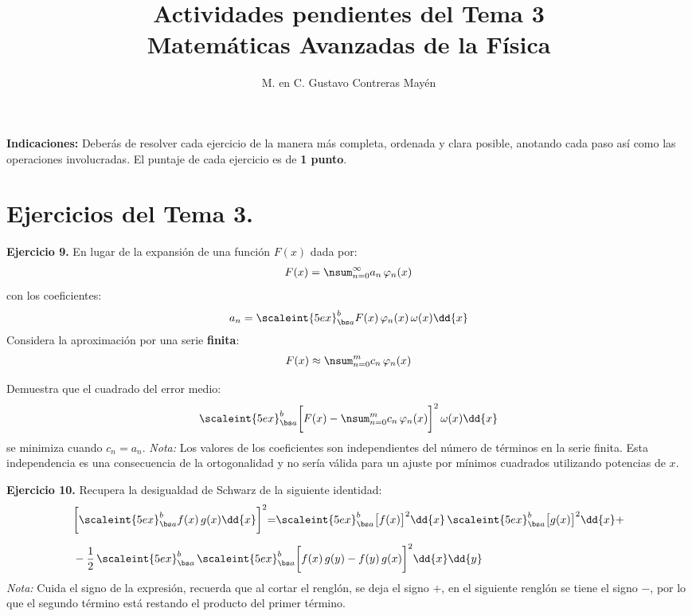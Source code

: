 
\usepackage{apacite}
\title{Actividades pendientes del Tema 3 \\[0.3em]  \large{Matemáticas Avanzadas de la Física}\vspace{-3ex}}
\author{M. en C. Gustavo Contreras Mayén}
\date{ }

\vspace{-4cm}
\maketitle
\fontsize{14}{14}\selectfont

\textbf{Indicaciones: } Deberás de resolver cada ejercicio de la manera más completa, ordenada y clara posible, anotando cada paso así como las operaciones involucradas. El puntaje de cada ejercicio es de \textbf{1 punto}.

\section{Ejercicios del Tema 3.}
\textbf{Ejercicio 9. } En lugar de la expansión de una función $F(x)$ dada por:
\begin{align*}
F(x) = \nsum_{n=0}^{\infty} a_{n} \, \varphi_{n} (x)
\end{align*}
con los coeficientes:
\begin{align*}
a_{n} = \scaleint{5ex}_{\bs a}^{b} F(x) \, \varphi_{n} (x) \, \omega (x) \dd{x}
\end{align*}
Considera la aproximación por una serie \textbf{finita}:
\begin{align*}
F(x) \approx \nsum_{n=0}^{m} c_{n} \, \varphi_{n} (x)
\end{align*}

Demuestra que el cuadrado del error medio:
\begin{align*}
\scaleint{5ex}_{\bs a}^{b} \bigg[ F(x) - \nsum_{n=0}^{m} c_{n} \, \varphi_{n} (x) \bigg]^{2} \, \omega (x) \dd{x}
\end{align*}
se minimiza cuando $c_{n} = a_{n}$. \emph{Nota: } Los valores de los coeficientes son independientes del número de términos en la serie finita. Esta independencia es una consecuencia de la ortogonalidad y no sería válida para un ajuste por mínimos cuadrados utilizando potencias de $x$.
\par
\textbf{Ejercicio 10. } Recupera la desigualdad de Schwarz de la siguiente identidad:
\begin{align*}
&\bigg[ \scaleint{5ex}_{\bs a}^{b} f(x) \, g(x) \dd{x} \bigg
]^{2} {=} \scaleint{5ex}_{\bs a}^{b} \big[ f(x) \big
]^{2} \dd{x} \, \scaleint{5ex}_{\bs a}^{b} \big[ g(x) \big
]^{2} \dd{x} + \\[0.5em]
&- \dfrac{1}{2} \, \scaleint{5ex}_{\bs a}^{b} \, \scaleint{5ex}_{\bs a}^{b} \bigg[ f(x) \, g(y) - f(y) \, g(x) \bigg
]^{2} \dd{x} \dd{y}
\end{align*}
\emph{Nota:} Cuida el signo de la expresión, recuerda que al cortar el renglón, se deja el signo $+$, en el siguiente renglón se tiene el signo $-$, por lo que el segundo término está restando el producto del primer término.

